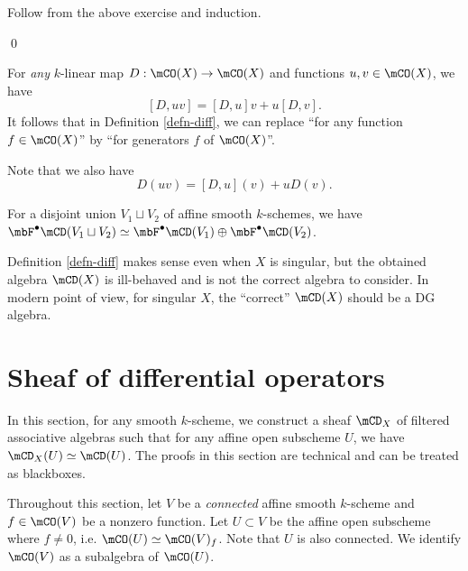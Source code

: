 	\proof
		Follow from the above exercise and induction.

	\qed

	\begin{rem}
		\label{rem-check-diff}
		For \emph{any} $k$-linear map $D: \mCO(X) \to \mCO(X)$ and functions $u,v\in \mCO(X)$, we have
		\begin{equation}
			\label{eqn-lebniz-for-commutator}
			[D, uv] = [D,u]v + u[D,v].
		\end{equation}
		It follows that in Definition \ref{defn-diff}, we can replace ``for any function $f\in \mCO(X)$'' by ``for generators $f$ of $\mCO(X)$''.

		Note that we also have
		\begin{equation}
			\label{eqn-lebniz-for-operator}
			D(uv) = [D,u](v) + uD(v).
		\end{equation}

	\end{rem}

	\begin{rem}
		\label{rem-diff-disj}
		For a disjoint union $V_1\sqcup V_2$ of affine smooth $k$-schemes, we have $\mbF^\bullet \mCD(V_1\sqcup V_2) \simeq \mbF^\bullet \mCD(V_1) \oplus  \mbF^\bullet \mCD(V_2)$. 
	\end{rem}



	\begin{warn}
		Definition \ref{defn-diff} makes sense even when $X$ is singular, but the obtained algebra $\mCD(X)$ is ill-behaved and is not the correct algebra to consider. In modern point of view, for singular $X$, the ``correct'' $\mCD(X)$ should be a DG algebra.
	\end{warn}

\section{Sheaf of differential operators}

	In this section, for any smooth $k$-scheme, we construct a sheaf $\mCD_X$ of filtered associative algebras such that for any affine open subscheme $U$, we have $\mCD_X(U) \simeq \mCD(U)$. The proofs in this section are technical and can be treated as blackboxes.

	Throughout this section, let $V$ be a \emph{connected} affine smooth $k$-scheme and $f\in \mCO(V)$ be a nonzero function. Let $U\subset V$ be the affine open subscheme where $f\neq 0$, i.e. $\mCO(U) \simeq \mCO(V)_f$. Note that $U$ is also connected. We identify $\mCO(V)$ as a subalgebra of $\mCO(U)$.

